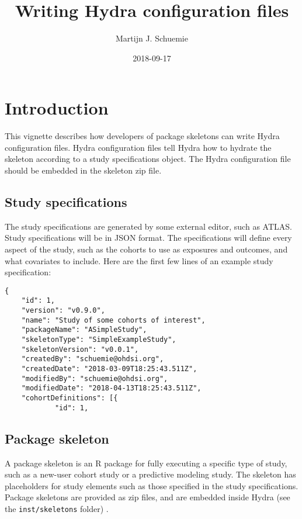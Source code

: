 \documentclass[]{article}
\title{Writing Hydra configuration files}
\author{Martijn J. Schuemie}
\date{2018-09-17}
\begin{document}
\maketitle

{
\setcounter{tocdepth}{2}
\tableofcontents
}
\hypertarget{introduction}{%
\section{Introduction}\label{introduction}}

This vignette describes how developers of package skeletons can write
Hydra configuration files. Hydra configuration files tell Hydra how to
hydrate the skeleton according to a study specifications object. The
Hydra configuration file should be embedded in the skeleton zip file.

\hypertarget{study-specifications}{%
\subsection{Study specifications}\label{study-specifications}}

The study specifications are generated by some external editor, such as
ATLAS. Study specifications will be in JSON format. The specifications
will define every aspect of the study, such as the cohorts to use as
exposures and outcomes, and what covariates to include. Here are the
first few lines of an example study specification:

\begin{verbatim}
{
    "id": 1,
    "version": "v0.9.0",
    "name": "Study of some cohorts of interest",
    "packageName": "ASimpleStudy",
    "skeletonType": "SimpleExampleStudy",
    "skeletonVersion": "v0.0.1",
    "createdBy": "schuemie@ohdsi.org",
    "createdDate": "2018-03-09T18:25:43.511Z",
    "modifiedBy": "schuemie@ohdsi.org",
    "modifiedDate": "2018-04-13T18:25:43.511Z",
    "cohortDefinitions": [{
            "id": 1,
\end{verbatim}

\hypertarget{package-skeleton}{%
\subsection{Package skeleton}\label{package-skeleton}}

A package skeleton is an R package for fully executing a specific type
of study, such as a new-user cohort study or a predictive modeling
study. The skeleton has placeholders for study elements such as those
specified in the study specifications. Package skeletons are provided as
zip files, and are embedded inside Hydra (see the
\texttt{inst/skeletons} folder) .
\end{document}
